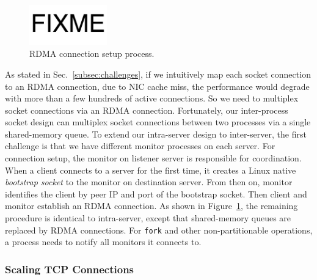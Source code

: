 \begin{figure}[t]
	\centering
	\includegraphics[width=0.3\textwidth]{images/fixme}
	\caption{RDMA connection setup process.}
	\label{fig:rdma}
\end{figure}

As stated in Sec.~\ref{subsec:challenges}, if we intuitively map each socket connection to an RDMA connection, due to NIC cache miss, the performance would degrade with more than a few hundreds of active connections. So we need to multiplex socket connections via an RDMA connection. %
Fortunately, our inter-process socket design can multiplex socket connections between two processes via a single shared-memory queue. %
To extend our intra-server design to inter-server, the first challenge is that we have different monitor processes on each server. For connection setup, the monitor on listener server is responsible for coordination. When a client connects to a server for the first time, it creates a Linux native \textit{bootstrap socket} to the monitor on destination server. From then on, monitor identifies the client by peer IP and port of the bootstrap socket. Then client and monitor establish an RDMA connection. As shown in Figure~\ref{fig:rdma}, the remaining procedure is identical to intra-server, except that shared-memory queues are replaced by RDMA connections. For \texttt{fork} and other non-partitionable operations, a process needs to notify all monitors it connects to.

\subsubsection{Scaling TCP Connections}

